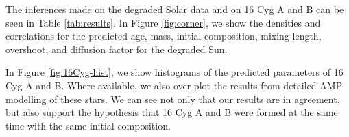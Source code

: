 \documentclass[manuscript]{aastex}
\begin{document}


The inferences made on the degraded Solar data and on 16 Cyg A and B can be seen in Table \ref{tab:results}. %
In Figure \ref{fig:corner}, we show the densities and correlations for the predicted age, mass, initial composition, mixing length, overshoot, and diffusion factor for the degraded Sun. 

In Figure \ref{fig:16Cyg-hist}, we show histograms of the predicted parameters of 16 Cyg A and B. Where available, we also over-plot the results from detailed AMP modelling \citep{2015ApJ...811L..37M} of these stars. We can see not only that our results are in agreement, but also support the hypothesis that 16 Cyg A and B were formed at the same time with the same initial composition. 

\end{document}
